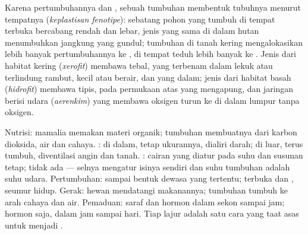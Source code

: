 \begin{proposition}\label{prop:b1:flowering-plant-organization:plasticity}
Karena pertumbuhannya  dan , sebuah tumbuhan
membentuk tubuhnya menurut tempatnya (\emph{keplastisan
fenotipe}): sebatang pohon yang tumbuh di
tempat terbuka bercabang rendah dan lebar, jenis yang sama di dalam
hutan menumbuhkan  jangkung yang gundul; tumbuhan di tanah kering
mengalokasikan lebih banyak pertumbuhannya ke , di tempat teduh
lebih banyak ke . Jenis dari habitat kering
(\emph{xerofit}) membawa  tebal,  yang
terbenam dalam lekuk atau terlindung rambut,  kecil atau berair, dan
 yang dalam; jenis dari habitat basah
(\emph{hidrofit}) membawa  tipis,  pada
permukaan atas  yang mengapung, dan jaringan berisi udara
(\emph{aerenkim}) yang membawa oksigen turun ke  di
dalam lumpur tanpa oksigen.
\end{proposition}

\begin{example}\label{ex:b1:flowering-plant-organization:comparison}
Nutrisi: mamalia memakan materi organik; tumbuhan membuatnya dari karbon
dioksida, air dan cahaya. : di dalam, tetap
ukurannya, dialiri darah; di luar, terus tumbuh, diventilasi angin dan
tanah. : cairan yang diatur pada suhu dan susunan
tetap; tidak ada --- selnya mengatur isinya sendiri dan suhu tumbuhan
adalah suhu udara. Pertumbuhan: sampai bentuk dewasa yang tertentu;
terbuka dan , seumur hidup. Gerak: hewan mendatangi makanannya;
tumbuhan tumbuh ke arah cahaya dan air. Pemaduan: saraf dan hormon dalam
sekon sampai jam; hormon saja, dalam jam sampai hari. Tiap lajur adalah
satu cara yang taat asas untuk menjadi .
\end{example}

